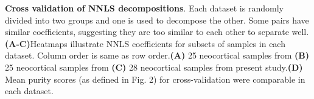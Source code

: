 \textbf{Cross validation of NNLS decompositions}.
 Each dataset is randomly divided into two groups and one is used to decompose the other. Some pairs have similar coefficients, suggesting they are too similar to each other to separate well. \textbf{(A-C)}Heatmaps illustrate NNLS coefficients for subsets of samples in each dataset. Column order is same as row order.\textbf{(A)} 25 neocortical samples from \cite{Tasic_2018} \textbf{(B)} 25 neocortical samples from \cite{Zeisel_2018}\textbf{(C)} 28 neocortical samples from present study.\textbf{(D)} Mean purity scores (as defined in Fig. 2) for cross-validation were comparable in each dataset.
 
